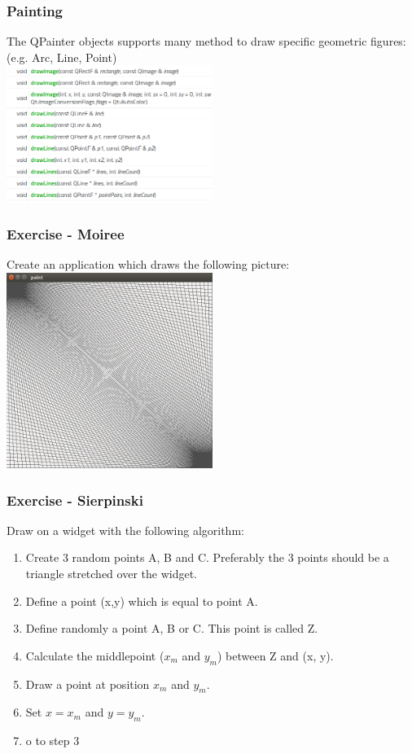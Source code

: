 \begin{frame}[fragile]
\frametitle{Painting}
The QPainter objects supports many method to draw specific geometric figures:
	(e.g. Arc, Line, Point)\\
	\vspace{3mm}
        \includegraphics[width=190pt]{img/painter.png}
\end{frame}

\begin{frame}[fragile]
\frametitle{Exercise - Moiree}
Create an application which draws the following picture:\\
\vspace{3mm}
\includegraphics[width=190pt]{img/moiree.png}
\end{frame}

\begin{frame}[fragile]
\frametitle{Exercise - Sierpinski}
Draw on a widget with the following algorithm:
{\small
\begin{enumerate}
\item Create 3 random points A, B and C. Preferably the 3 points should
be a triangle stretched over the widget.
\item Define a point (x,y) which is equal to point A.
\item Define randomly a point A, B or C. This point is called Z.
\item Calculate the middlepoint ($x_m$ and $y_m$) between Z and (x, y).
\item Draw a point at position $x_m$ and $y_m$.
\item Set $x=x_m$ and $y=y_m$.
\item o to step 3
\end{enumerate}
}
\end{frame}

